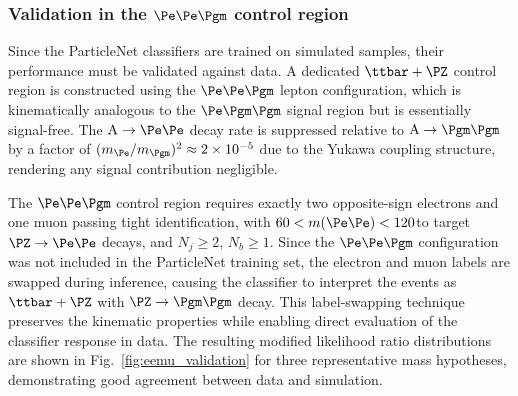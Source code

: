 \subsubsection{Validation in the $\Pe\Pe\Pgm$ control region}
\label{sssec:eemu_validation}

Since the ParticleNet classifiers are trained on simulated samples, their performance must be validated against data. A dedicated $\ttbar+\PZ$ control region is constructed using the $\Pe\Pe\Pgm$ lepton configuration, which is kinematically analogous to the $\Pe\Pgm\Pgm$ signal region but is essentially signal-free. The $\PA \to \Pe\Pe$ decay rate is suppressed relative to $\PA \to \Pgm\Pgm$ by a factor of $(m_\Pe / m_\Pgm)^2 \approx 2 \times 10^{-5}$ due to the Yukawa coupling structure, rendering any signal contribution negligible.

The $\Pe\Pe\Pgm$ control region requires exactly two opposite-sign electrons and one muon passing tight identification, with $60 < m(\Pe\Pe) < 120$\GeV to target $\PZ \to \Pe\Pe$ decays, and $N_j \geq 2$, $N_b \geq 1$. Since the $\Pe\Pe\Pgm$ configuration was not included in the ParticleNet training set, the electron and muon labels are swapped during inference, causing the classifier to interpret the events as $\ttbar+\PZ$ with $\PZ \to \Pgm\Pgm$ decay. This label-swapping technique preserves the kinematic properties while enabling direct evaluation of the classifier response in data. The resulting modified likelihood ratio distributions are shown in Fig.~\ref{fig:eemu_validation} for three representative mass hypotheses, demonstrating good agreement between data and simulation.

